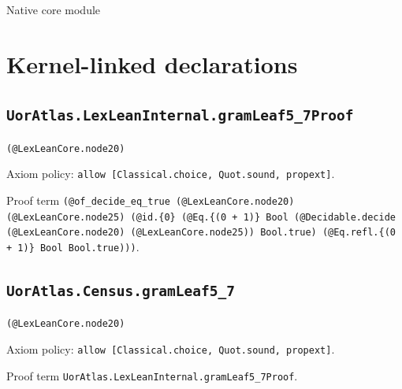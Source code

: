\documentclass[11pt]{article}
\begin{document}
\begin{center}{\LARGE Native core module}\end{center}
\section*{Kernel-linked declarations}
\subsection*{\texttt{UorAtlas.LexLeanInternal.gramLeaf5\_7Proof}}
\noindent\texttt{(@LexLeanCore.node20)}\par
\noindent Axiom policy: \texttt{allow [Classical.choice, Quot.sound, propext]}.\par
\noindent Proof term \texttt{(@of\_decide\_eq\_true (@LexLeanCore.node20) (@LexLeanCore.node25) (@id.\{0\} (@Eq.\{(0 + 1)\} Bool (@Decidable.decide (@LexLeanCore.node20) (@LexLeanCore.node25)) Bool.true) (@Eq.refl.\{(0 + 1)\} Bool Bool.true)))}.\par
\subsection*{\texttt{UorAtlas.Census.gramLeaf5\_7}}
\noindent\texttt{(@LexLeanCore.node20)}\par
\noindent Axiom policy: \texttt{allow [Classical.choice, Quot.sound, propext]}.\par
\noindent Proof term \texttt{UorAtlas.LexLeanInternal.gramLeaf5\_7Proof}.\par
\end{document}
